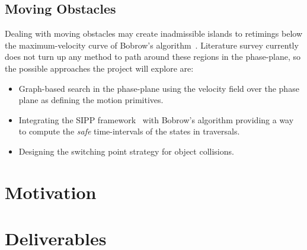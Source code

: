 \documentclass[10pt]{article} %
\begin{document}
\subsection{Moving Obstacles}\label{subsec:movobs}
Dealing with moving obstacles may create inadmissible islands to retimings below the maximum-velocity curve of Bobrow's algorithm~\cite{shin1985minimum}. Literature survey currently does not turn up any method to path around these regions in the phase-plane, so the possible approaches the project will explore are:

\begin{itemize}
\item Graph-based search in the phase-plane using the velocity field over the phase plane as defining the motion primitives.
\item Integrating the SIPP framework~\cite{phillips2011sipp} with Bobrow's algorithm providing a way to compute the \emph{safe} time-intervals of the states in traversals.
\item Designing the switching point strategy for object collisions.
\end{itemize}


\section{Motivation}


\section{Deliverables}
\end{document}
